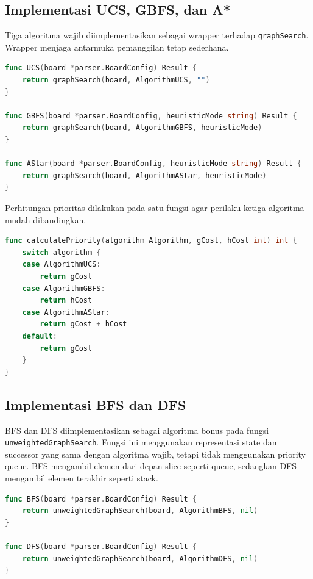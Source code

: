 \subsection{Implementasi UCS, GBFS, dan A*}\label{sub:Implementasi Algoritma}

Tiga algoritma wajib diimplementasikan sebagai wrapper terhadap
\texttt{graphSearch}. Wrapper menjaga antarmuka pemanggilan tetap
sederhana.

\begin{lstlisting}[language=Go, basicstyle=\ttfamily\small, breaklines=true]
func UCS(board *parser.BoardConfig) Result {
    return graphSearch(board, AlgorithmUCS, "")
}

func GBFS(board *parser.BoardConfig, heuristicMode string) Result {
    return graphSearch(board, AlgorithmGBFS, heuristicMode)
}

func AStar(board *parser.BoardConfig, heuristicMode string) Result {
    return graphSearch(board, AlgorithmAStar, heuristicMode)
}
\end{lstlisting}

Perhitungan prioritas dilakukan pada satu fungsi agar perilaku ketiga
algoritma mudah dibandingkan.

\begin{lstlisting}[language=Go, basicstyle=\ttfamily\small, breaklines=true]
func calculatePriority(algorithm Algorithm, gCost, hCost int) int {
    switch algorithm {
    case AlgorithmUCS:
        return gCost
    case AlgorithmGBFS:
        return hCost
    case AlgorithmAStar:
        return gCost + hCost
    default:
        return gCost
    }
}
\end{lstlisting}

\subsection{Implementasi BFS dan DFS}\label{sub:Implementasi BFS DFS}

BFS dan DFS diimplementasikan sebagai algoritma bonus pada fungsi
\texttt{unweightedGraphSearch}. Fungsi ini menggunakan representasi
state dan successor yang sama dengan algoritma wajib, tetapi tidak
menggunakan priority queue. BFS mengambil elemen dari depan slice
seperti queue, sedangkan DFS mengambil elemen terakhir seperti stack.

\begin{lstlisting}[language=Go, basicstyle=\ttfamily\small, breaklines=true]
func BFS(board *parser.BoardConfig) Result {
    return unweightedGraphSearch(board, AlgorithmBFS, nil)
}

func DFS(board *parser.BoardConfig) Result {
    return unweightedGraphSearch(board, AlgorithmDFS, nil)
}
\end{lstlisting}


